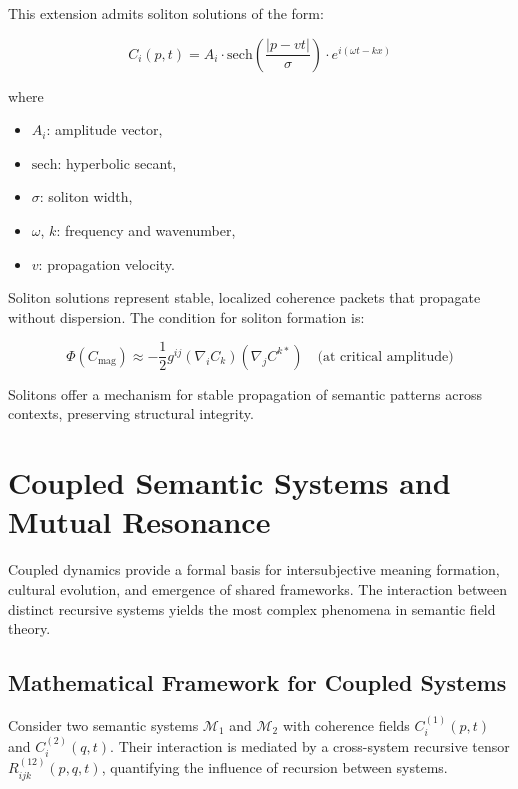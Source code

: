 This extension admits soliton solutions of the form:

\begin{equation}
C_i(p,t) = A_i \cdot \text{sech}\left(\frac{|p-vt|}{\sigma}\right) \cdot e^{i(\omega t - kx)}
\end{equation}

where

\begin{itemize}
    \item \(A_i\): amplitude vector,
    \item \(\text{sech}\): hyperbolic secant,
    \item \(\sigma\): soliton width,
    \item \(\omega\), \(k\): frequency and wavenumber,
    \item \(v\): propagation velocity.
\end{itemize}

Soliton solutions represent stable, localized coherence packets that propagate without dispersion. The condition for soliton formation is:

\begin{equation}
\Phi(C_{\mathrm{mag}}) \approx -\frac{1}{2}g^{ij}(\nabla_i C_k)(\nabla_j C^{k*}) \quad \text{(at critical amplitude)}
\end{equation}

Solitons offer a mechanism for stable propagation of semantic patterns across contexts, preserving structural integrity.

\section{Coupled Semantic Systems and Mutual Resonance}

Coupled dynamics provide a formal basis for intersubjective meaning formation, cultural evolution, and emergence of shared frameworks. The interaction between distinct recursive systems yields the most complex phenomena in semantic field theory.

\subsection{Mathematical Framework for Coupled Systems}

Consider two semantic systems \(\mathcal{M}_1\) and \(\mathcal{M}_2\) with coherence fields \(C^{(1)}_i(p,t)\) and \(C^{(2)}_i(q,t)\). Their interaction is mediated by a cross-system recursive tensor \(R^{(12)}_{ijk}(p,q,t)\), quantifying the influence of recursion between systems.

